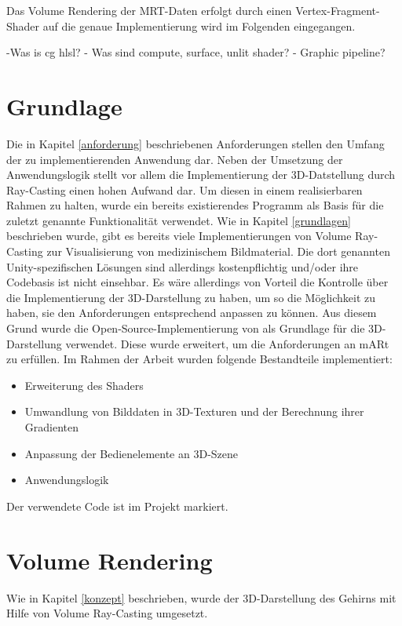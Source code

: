 Das Volume Rendering der MRT-Daten erfolgt durch einen Vertex-Fragment-Shader auf die genaue Implementierung wird im Folgenden eingegangen. 

-Was is cg hlsl?
- Was sind compute, surface, unlit shader?
- Graphic pipeline?

\section{Grundlage}

Die in Kapitel \ref{anforderung} beschriebenen Anforderungen stellen den Umfang der zu implementierenden Anwendung dar. 
Neben der Umsetzung der Anwendungslogik stellt vor allem die Implementierung der 3D-Datstellung durch Ray-Casting einen hohen Aufwand dar. Um diesen in einem realisierbaren Rahmen zu halten, wurde ein bereits existierendes Programm als Basis für die zuletzt genannte Funktionalität verwendet.
Wie in Kapitel \ref{grundlagen} beschrieben wurde, gibt es bereits viele Implementierungen von Volume Ray-Casting zur Visualisierung von medizinischem Bildmaterial. 
Die dort genannten Unity-spezifischen Lösungen sind allerdings kostenpflichtig und/oder ihre Codebasis ist nicht einsehbar. Es wäre allerdings von Vorteil die Kontrolle über die Implementierung der 3D-Darstellung zu haben, um so die Möglichkeit zu haben, sie den Anforderungen entsprechend anpassen zu können.
Aus diesem Grund wurde die Open-Source-Implementierung von \citet{volumeRenderingGit} als Grundlage für die 3D-Darstellung verwendet. 
Diese wurde erweitert, um die Anforderungen an mARt zu erfüllen. 
Im Rahmen der Arbeit wurden folgende Bestandteile implementiert:

\begin{itemize}
\item Erweiterung des Shaders
\item Umwandlung von Bilddaten in 3D-Texturen und der Berechnung ihrer Gradienten
\item Anpassung der Bedienelemente an 3D-Szene
\item Anwendungslogik
\end{itemize}
Der verwendete Code ist im Projekt markiert.
\section{Volume Rendering}

Wie in Kapitel \ref{konzept} beschrieben, wurde der 3D-Darstellung des Gehirns mit Hilfe von Volume Ray-Casting umgesetzt. 


